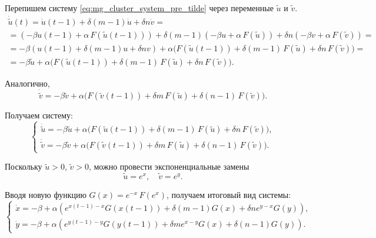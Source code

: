 Перепишем систему \eqref{eq:mg_cluster_system_pre_tilde} через переменные $\tilde{u}$ и $\tilde{v}$.
\begin{multline*}
	\dot{\tilde{u}}(t) = \dot{u}(t - 1) + \delta (m - 1) \dot{u} + \delta n \dot{v} =\\= \left(-\beta u(t - 1) + \alpha \, F(\tilde{u}(t - 1))\right) + \delta (m - 1)(-\beta u + \alpha\, F(\tilde{u})) + \delta n (-\beta v + \alpha \, F(\tilde{v})) =\\
	= -\beta(u(t - 1) + \delta (m - 1)u + \delta nv) + \alpha\big(F(\tilde{u}(t - 1)) + \delta (m - 1) \, F(\tilde{u}) + \delta n \, F(\tilde{v})\big) = \\
	= -\beta \tilde{u} + \alpha \big(F(\tilde{u}(t - 1)) + \delta (m - 1)\, F(\tilde{u}) + \delta n \, F(\tilde{v})\big).
\end{multline*}

Аналогично,
\[
\dot{\tilde{v}} = -\beta \tilde{v} + \alpha \big(F(\tilde{v}(t - 1)) + \delta m \, F(\tilde{u}) + \delta (n - 1) \, F(\tilde{v})\big).
\]

Получаем систему:
%
\begin{equation}
	\label{eq:mg_cluster_system_tilde}
	\begin{cases}
		\dot{\tilde{u}} = -\beta \tilde{u} + \alpha \big(F(\tilde{u}(t - 1)) + \delta (m - 1) \, F(\tilde{u}) + \delta n \, F(\tilde{v})\big),\\
		\dot{\tilde{v}} = -\beta \tilde{v} + \alpha \big(F(\tilde{v}(t - 1)) + \delta m \, F(\tilde{u}) + \delta (n - 1) \, F(\tilde{v})\big).
	\end{cases}
\end{equation}

Поскольку $\tilde{u} > 0$, $\tilde{v} > 0$, можно провести экспоненциальные замены
\begin{equation}
	\label{eq:exp_change}
	\tilde{u} = e^x, \quad \tilde{v} = e^y.
\end{equation}

Вводя новую функцию $G(x) = e^{-x} \, F(e^x)$, получаем итоговый вид системы:
\begin{equation}
	\label{eq:system_main}
	\begin{cases}
		\dot{x} = -\beta + \alpha \left(e^{x(t - 1) - x} G(x(t - 1)) + \delta (m - 1) G(x) + \delta n e^{y - x} G(y)\right),\\
		\dot{y} = -\beta + \alpha \left(e^{y(t - 1) - y} G(y(t - 1)) + \delta m e^{x - y} G(x) + \delta (n - 1) G(y)\right).
	\end{cases}
\end{equation}

